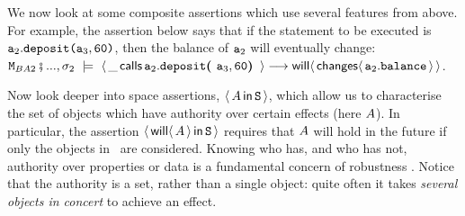 %
%
%
%

 We now look at some composite assertions which use  
 several features from above. For example, the assertion below 
says that if the statement to be executed is   ${{\mbox{\tt{a}}}}_2.{\mbox{\tt{deposit}}}{\mbox{\tt{(}}}{{\mbox{\tt{a}}}}_3,{\mbox{\tt{60}}}{\mbox{\tt{)}}}$,
then the balance of ${{\mbox{\tt{a}}}}_2$ will eventually change:\\

\vspace*{-1mm}
\noindent $\M_{BA2}\mkpair ...,\sigma_2 \ \models \ {\Calls {\_}   {\prg{deposit}} {\acc_2} {\acc_3,\prg{60}} } \longrightarrow {\Future{ \Changes {\acc_2.\bal}}}$.

\vspace{.2cm}
 
Now look deeper into space assertions, $\langle\, A\, \mathsf{in}\, {{\mbox{\tt{S}}}}\, \rangle$, which
allow us to characterise the set of objects which have authority over
certain effects (here $A$). In particular,  the assertion   $\langle\, {\mathsf{will}}\langle \,A\,\rangle\, \mathsf{in}\, {{\mbox{\tt{S}}}}\, \rangle$  requires that $A$ will hold in
the future if only the objects in \SF\ are considered.
Knowing who has, and who has not, authority over properties or data is a fundamental concern of robustness
\cite{MillerPhD}. Notice that the authority is a set, rather than a single object: quite often it takes \emph{several objects in concert}
 to achieve an effect.



